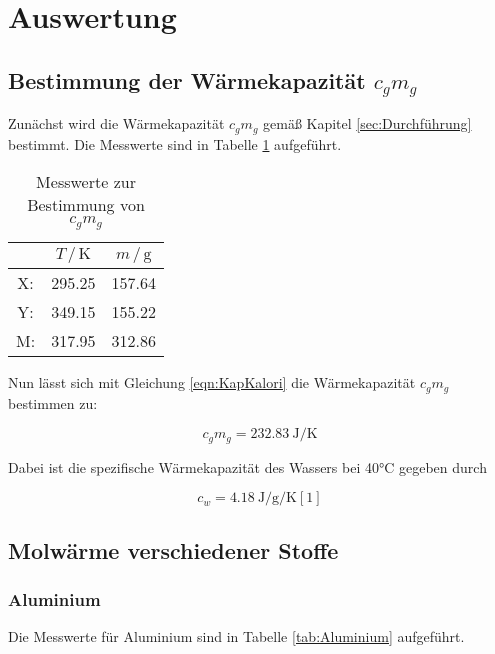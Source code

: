 \section{Auswertung}
\label{sec:Auswertung}


\subsection {Bestimmung der Wärmekapazität $c_g m_g$}

Zunächst wird die Wärmekapazität $c_g m_g$ gemäß Kapitel \ref{sec:Durchführung}
bestimmt. Die Messwerte sind in Tabelle \ref{tab:Kalorimeter} aufgeführt.

\begin{table}
\centering
\caption{Messwerte zur Bestimmung von $c_g m_g$}
\label{tab:Kalorimeter}
\begin{tabular}{c c c}
\toprule
$ $ & $T \,/\, \si{\kelvin}$& $m \,/\, \si{\gram}$\\
\midrule
X: & 295.25 & 157.64\\
Y: & 349.15 & 155.22\\
M: & 317.95 & 312.86\\
\bottomrule
\end{tabular}
\end{table}

Nun lässt sich mit Gleichung \eqref{eqn:KapKalori} die Wärmekapazität $c_g m_g$ 
bestimmen zu: 

\begin{equation*}
c_g m_g = \SI{232.83}{\joule\per\kelvin}
\end{equation*}

Dabei ist die spezifische Wärmekapazität des Wassers bei 40°C gegeben durch

\begin{equation}
c_w = \SI{4.18}{\joule\per\gram\per\kelvin} [1]
\end{equation}

\subsection{Molwärme verschiedener Stoffe}

\subsubsection{Aluminium}

Die Messwerte für Aluminium sind in Tabelle \ref{tab:Aluminium} aufgeführt.

